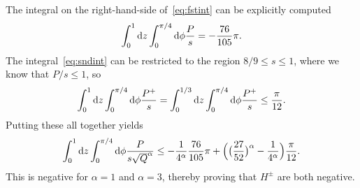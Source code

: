 \documentclass[a4paper]{amsart}
\newcommand{\dd}{{\rm d}}
\theoremstyle{plain} %
\theoremstyle{definition} %
\theoremstyle{remark}
\begin{document}
The integral on the right-hand-side of~\eqref{eq:fstint} can be explicitly
computed
\[
	\int_0^1 \dd z \int_0^{\pi/4} \dd\phi \frac{P}{s} = -\frac{76}{105}\pi.
\]
The integral~\eqref{eq:sndint} can be restricted to the region $8/9 \le s \le
1$, where we know that $P/s \le 1$, so
\[
	\int_0^1 \dd z \int_0^{\pi/4} \dd\phi \frac{P^+}{s} = 
	\int_0^{1/3} \dd z \int_0^{\pi/4} \dd\phi \frac{P^+}{s} \le \frac{\pi}{12}.
\]
Putting these all together yields
\[
	\int_0^1 \dd z \int_0^{\pi/4} 
	\dd\phi \frac{P}{s \sqrt{Q}^\alpha} \le
	- \frac{1}{4^\alpha}\frac{76}{105}\pi + \Big(\big(\frac{27}{52}\big)^\alpha - \frac{1}{4^\alpha}\Big) \frac{\pi}{12}.
\]
This is negative for $\alpha=1$ and $\alpha=3$, thereby proving that $H^\pm$
are both negative.
\end{document}
